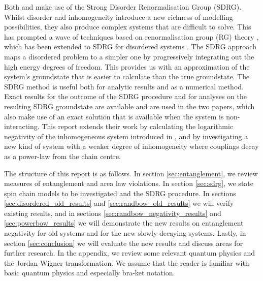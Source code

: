 Both \cite{paola2016} and \cite{paola2018} make use of the Strong Disorder Renormalisation Group (SDRG). Whilst disorder and inhomogeneity introduce a new richness of modelling possibilities, they also produce complex systems that are difficult to solve. This has prompted a wave of techniques based on renormalisation group (RG) theory \cite{Fisher1994}, which has been extended to SDRG for disordered systems \cite{dasgupta_ma_1980}. The SDRG approach maps a disordered problem to a simpler one by progressively integrating out the high energy degrees of freedom. This provides us with an approximation of the system's groundstate that is easier to calculate than the true groundstate. The SDRG method is useful both for analytic results and as a numerical method. Exact results for the outcome of the SDRG procedure and for analyses on the resulting SDRG groundstate are available and are used in the two papers, which also make use of an exact solution that is available when the system is non-interacting. This report extends their work by calculating the logarithmic negativity of the inhomogeneous system introduced in \cite{paola2018}, and by investigating a new kind of system with a weaker degree of inhomogeneity where couplings decay as a power-law from the chain centre.


The structure of this report is as follows. In section \ref{sec:entanglement}, we review measures of entanglement and area law violations. In section \ref{sec:sdrg}, we state spin chain models to be investigated and the SDRG procedure. In sections \ref{sec:disordered_old_results} and \ref{sec:randbow_old_results} we will verify existing results, and in sections \ref{sec:randbow_negativity_results} and \ref{sec:powerbow_results} we will demonstrate the new results on entanglement negativity for old systems and for the new slowly decaying systems. Lastly, in section \ref{sec:conclusion} we will evaluate the new results and discuss areas for further research. In the appendix, we review some relevant quantum physics and the Jordan-Wigner transformation. We assume that the reader is familiar with basic quantum physics and especially bra-ket notation.





